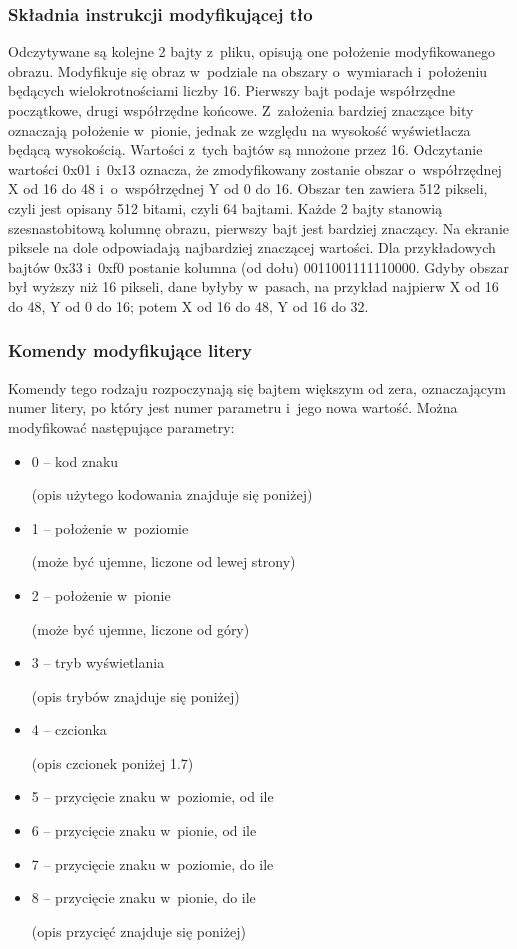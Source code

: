 \subsubsection{Składnia instrukcji modyfikującej tło}
Odczytywane są kolejne 2 bajty z~pliku, opisują one położenie modyfikowanego obrazu. Modyfikuje się obraz w~podziale na obszary o~wymiarach i~położeniu będących wielokrotnościami liczby 16. Pierwszy bajt podaje współrzędne początkowe, drugi współrzędne końcowe. Z~założenia bardziej znaczące bity oznaczają położenie w~pionie, jednak ze względu na wysokość wyświetlacza będącą wysokością. Wartości z~tych bajtów są mnożone przez 16. Odczytanie wartości 0x01 i~0x13 oznacza, że zmodyfikowany zostanie obszar o~współrzędnej X od 16 do 48 i~o~współrzędnej Y od 0 do 16. Obszar ten zawiera 512 pikseli, czyli jest opisany 512 bitami, czyli 64 bajtami. Każde 2 bajty stanowią szesnastobitową kolumnę obrazu, pierwszy bajt jest bardziej znaczący. Na ekranie piksele na dole odpowiadają najbardziej znaczącej wartości. Dla przykładowych bajtów 0x33 i~0xf0 postanie kolumna (od dołu) 0011001111110000. Gdyby obszar był wyższy niż 16 pikseli, dane byłyby w~pasach, na przykład najpierw X od 16 do 48, Y od 0 do 16; potem X od 16 do 48, Y od 16 do 32.

\subsubsection{Komendy modyfikujące litery}
Komendy tego rodzaju rozpoczynają się bajtem większym od zera, oznaczającym numer litery, po który jest numer parametru i~jego nowa wartość. Można modyfikować następujące parametry:
\begin{itemize}
\item 0 – kod znaku

(opis użytego kodowania znajduje się poniżej)
\item 1 – położenie w~poziomie

(może być ujemne, liczone od lewej strony)
\item 2 – położenie w~pionie

(może być ujemne, liczone od góry)
\item 3 – tryb wyświetlania

(opis trybów znajduje się poniżej)
\item 4 – czcionka

(opis czcionek poniżej 1.7)
\item 5 – przycięcie znaku w~poziomie, od ile
\item 6 – przycięcie znaku w~pionie, od ile
\item 7 – przycięcie znaku w~poziomie, do ile
\item 8 – przycięcie znaku w~pionie, do ile

(opis przycięć znajduje się poniżej)
\end{itemize}

